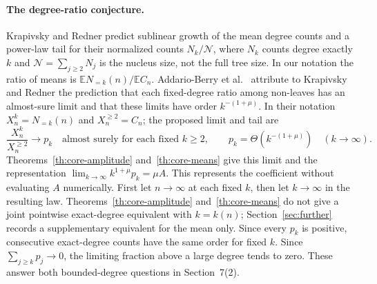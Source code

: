 \documentclass[11pt]{article}
\theoremstyle{remark}
\numberwithin{equation}{section}
\newcommand{\E}{\mathbb E}
\begin{document}
\paragraph{The degree-ratio conjecture.}
Krapivsky and Redner \cite[Sec.~5.1, Eqs.~(32)--(33)]{KR} predict sublinear growth of the mean degree counts and a power-law tail for their normalized counts $N_k/\mathcal N$, where $N_k$ counts degree exactly $k$ and $\mathcal N=\sum_{j\ge2}N_j$ is the nucleus size, not the full tree size. In our notation the ratio of means is $\E N_{=k}(n)/\E C_n$. Addario-Berry et al.\ \cite[Sec.~7, Question~2]{AB} attribute to Krapivsky and Redner the prediction that each fixed-degree ratio among non-leaves has an almost-sure limit and that these limits have order $k^{-(1+\mu)}$. In their notation $X_n^k=N_{=k}(n)$ and $X_n^{\ge2}=C_n$; the proposed limit and tail are
\[
  \frac{X_n^k}{X_n^{\ge2}}\longrightarrow p_k \quad\text{almost surely for each fixed } k\ge2,
  \qquad p_k=\Theta(k^{-(1+\mu)})\quad(k\to\infty).
\]
Theorems~\ref{th:core-amplitude} and~\ref{th:core-means} give this limit and the representation $\lim_{k\to\infty}k^{1+\mu}p_k=\mu A$. This represents the coefficient without evaluating $A$ numerically. First let $n\to\infty$ at each fixed $k$, then let $k\to\infty$ in the resulting law. Theorems~\ref{th:core-amplitude} and~\ref{th:core-means} do not give a joint pointwise exact-degree equivalent with $k=k(n)$; Section~\ref{sec:further} records a supplementary equivalent for the mean only. Since every $p_k$ is positive, consecutive exact-degree counts have the same order for fixed $k$. Since $\sum_{j\ge k}p_j\to0$, the limiting fraction above a large degree tends to zero. These answer both bounded-degree questions in Section~7(2).
\end{document}
